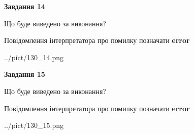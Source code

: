 \documentclass[11pt, ukrainian]{article}
\begin{document}
{\begin {large}
{\begin {center}\textbf{Завдання 14}\end {center}}\par
Що буде виведено за виконання? \par
Повідомлення інтерпретатора про помилку позначати \textbf{error}

\begin{center}
	{../pict/130_14.png}
\end{center}
\newpage

{\begin {center}\textbf{Завдання 15}\end {center}}\par
Що буде виведено за виконання? \par
Повідомлення інтерпретатора про помилку позначати \textbf{error}

\begin{center}
	{../pict/130_15.png}
\end{center}
\newpage

\end {large}}
\end{document}
